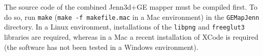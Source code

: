 \documentclass{article}
\begin{document}
The source code of the combined Jenn3d+GE mapper must be compiled first. To do
so, run \texttt{make} (\texttt{make -f makefile.mac} in a Mac environment) in
the \texttt{GEMapJenn} directory. In a Linux environment, installations of
the \texttt{libpng} and \texttt{freeglut3} libraries are required, whereas in a Mac 
a recent installation of XCode is required (the software has not been tested in a 
Windows environment).
\end{document}
